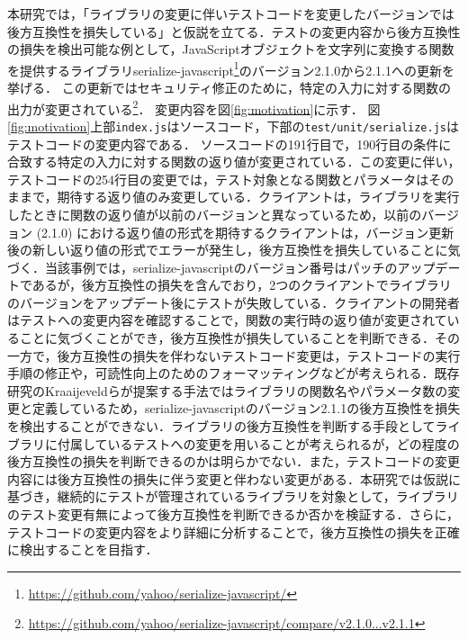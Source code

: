 \documentclass[submit]{ipsj}
\begin{document}

本研究では，「ライブラリの変更に伴いテストコードを変更したバージョンでは後方互換性を損失している」と仮説を立てる．テストの変更内容から後方互換性の損失を検出可能な例として，JavaScriptオブジェクトを文字列に変換する関数を提供するライブラリserialize-javascript\footnote{\url{https://github.com/yahoo/serialize-javascript/}}のバージョン2.1.0から2.1.1への更新を挙げる．
この更新ではセキュリティ修正のために，特定の入力に対する関数の出力が変更されている\footnote{\url{https://github.com/yahoo/serialize-javascript/compare/v2.1.0...v2.1.1}}．
変更内容を図\ref{fig:motivation}に示す．
図\ref{fig:motivation}上部{\verb|index.js|}はソースコード，下部の{\verb|test/unit/serialize.js|}はテストコードの変更内容である．
ソースコードの191行目で，190行目の条件に合致する特定の入力に対する関数の返り値が変更されている．この変更に伴い，テストコードの254行目の変更では，テスト対象となる関数とパラメータはそのままで，期待する返り値のみ変更している．クライアントは，ライブラリを実行したときに関数の返り値が以前のバージョンと異なっているため，以前のバージョン (2.1.0) における返り値の形式を期待するクライアントは，バージョン更新後の新しい返り値の形式でエラーが発生し，後方互換性を損失していることに気づく．当該事例では，serialize-javascriptのバージョン番号はパッチのアップデートであるが，後方互換性の損失を含んでおり，2つのクライアントでライブラリのバージョンをアップデート後にテストが失敗している．クライアントの開発者はテストへの変更内容を確認することで，関数の実行時の返り値が変更されていることに気づくことができ，後方互換性が損失していることを判断できる．その一方で，後方互換性の損失を伴わないテストコード変更は，テストコードの実行手順の修正や，可読性向上のためのフォーマッティングなどが考えられる．既存研究のKraaijeveldら\cite{detecting-breaking-changes-in-js-apis}が提案する手法ではライブラリの関数名やパラメータ数の変更と定義しているため，serialize-javascriptのバージョン2.1.1の後方互換性を損失を検出することができない．ライブラリの後方互換性を判断する手段としてライブラリに付属しているテストへの変更を用いることが考えられるが，どの程度の後方互換性の損失を判断できるのかは明らかでない．また，テストコードの変更内容には後方互換性の損失に伴う変更と伴わない変更がある．本研究では仮説に基づき，継続的にテストが管理されているライブラリを対象として，ライブラリのテスト変更有無によって後方互換性を判断できるか否かを検証する．さらに，テストコードの変更内容をより詳細に分析することで，後方互換性の損失を正確に検出することを目指す．
\end{document}

